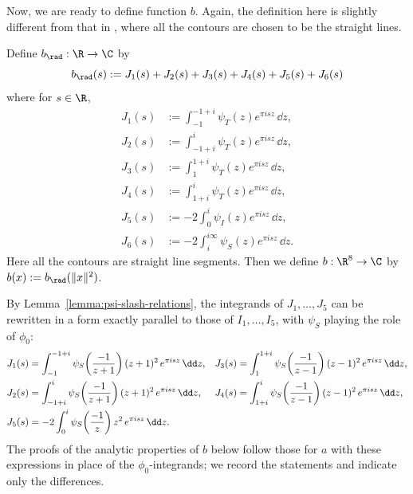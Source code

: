Now, we are ready to define function $b$.
Again, the definition here is slightly different from that in \cite{Via2017}, where all the contours are chosen to be the straight lines.

\begin{definition}\label{def:b-definition}\leanok
Define $b_\rad : \R \to \C$ by
\begin{equation}
    \label{eqn:b-definition}
    b_\rad(s) := J_1(s) + J_2(s) + J_3(s) + J_4(s) + J_5(s) + J_6(s)
\end{equation}
where for $s \in \R$,
\begin{align}
    J_1(s) &:= \int_{-1}^{-1 + i} \psi_T(z) e^{\pi i s z} \, \dd z, \label{eqn:J1} \\
    J_2(s) &:= \int_{-1 + i}^{i} \psi_T(z) e^{\pi i s z} \, \dd z, \label{eqn:J2} \\
    J_3(s) &:= \int_{1}^{1 + i} \psi_T(z) e^{\pi i s z} \, \dd z, \label{eqn:J3} \\
    J_4(s) &:= \int_{1 + i}^{i} \psi_T(z) e^{\pi i s z} \, \dd z, \label{eqn:J4} \\
    J_5(s) &:= -2 \int_{0}^{i} \psi_I(z) e^{\pi i s z} \, \dd z, \label{eqn:J5} \\
    J_6(s) &:= -2 \int_{i}^{i \infty} \psi_S(z) e^{\pi i s z} \, \dd z. \label{eqn:J6}
\end{align}
Here all the contours are straight line segments.
Then we define $b : \R^8 \to \C$ by $b(x) := b_\rad(\|x\|^2)$.
\end{definition}

By Lemma~\ref{lemma:psi-slash-relations}, the integrands of $J_1, \ldots, J_5$ can be rewritten in a form exactly parallel to those of $I_1, \ldots, I_5$, with $\psi_S$ playing the role of $\phi_0$:
\begin{align}
    J_1(s) &= \int_{-1}^{-1 + i} \psi_S\!\left(\frac{-1}{z + 1}\right) (z + 1)^2\, e^{\pi i s z} \, \dd z,
    & J_3(s) &= \int_{1}^{1 + i} \psi_S\!\left(\frac{-1}{z - 1}\right) (z - 1)^2\, e^{\pi i s z} \, \dd z, \label{eqn:J-in-psiS-form}\\
    J_2(s) &= \int_{-1 + i}^{i} \psi_S\!\left(\frac{-1}{z + 1}\right) (z + 1)^2\, e^{\pi i s z} \, \dd z,
    & J_4(s) &= \int_{1 + i}^{i} \psi_S\!\left(\frac{-1}{z - 1}\right) (z - 1)^2\, e^{\pi i s z} \, \dd z, \notag\\
    J_5(s) &= -2\int_{0}^{i} \psi_S\!\left(\frac{-1}{z}\right) z^2\, e^{\pi i s z} \, \dd z. \notag
\end{align}
The proofs of the analytic properties of $b$ below follow those for $a$ with these expressions in place of the $\phi_0$-integrands; we record the statements and indicate only the differences.

